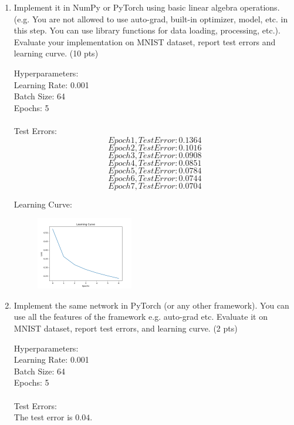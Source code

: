 \documentclass[a4paper]{article}
\theoremstyle{definition}
\newenvironment{soln}{
    \leavevmode\color{blue}\ignorespaces
}{}
\begin{document}
\begin{enumerate}
\begin{soln}
    \end{soln}
    \item Implement it in NumPy or PyTorch using basic linear algebra operations. (e.g. You are not allowed to use auto-grad, built-in optimizer, model, etc. in this step. You can use library functions for data loading, processing, etc.). Evaluate your implementation on MNIST dataset, report test errors and learning curve. (10 pts)
    \\
    \begin{soln}
        Hyperparameters: \\
        Learning Rate: 0.001 \\
        Batch Size: 64 \\
        Epochs: 5 \\
        \\
        Test Errors:\\
        $$Epoch 1, Test Error: 0.1364$$
        $$Epoch 2, Test Error: 0.1016$$
        $$Epoch 3, Test Error: 0.0908$$
        $$Epoch 4, Test Error: 0.0851$$
        $$Epoch 5, Test Error: 0.0784$$
        $$Epoch 6, Test Error: 0.0744$$
        $$Epoch 7, Test Error: 0.0704$$

        Learning Curve:\\
        \begin{figure}[h!]
            \centering
            \includegraphics[width=0.4\textwidth]{4.2.png}  
        \end{figure}
    \end{soln}
    \item Implement the same network in PyTorch (or any other framework). You can use all the features of the framework e.g. auto-grad etc. Evaluate it on MNIST dataset, report test errors, and learning curve. (2 pts)
    \\
    \begin{soln}
        Hyperparameters: \\
        Learning Rate: 0.001 \\
        Batch Size: 64 \\
        Epochs: 5 \\
        \\
        Test Errors:\\
        The test error is $0.04$.


\end{soln}
\end{enumerate}
\end{document}
